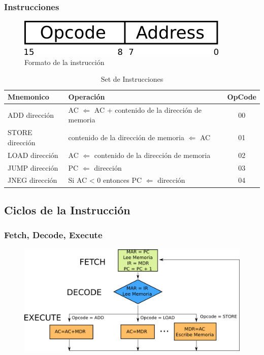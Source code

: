 \documentclass{beamer}
\begin{document}
\begin{frame}
\frametitle{Instrucciones}  
\begin{figure}[h]
  \centering
    \includegraphics[width=.3\textwidth]{graficos/instruccion.png}
  \caption{Formato de la instrucción}
  \label{instruction}
\end{figure} 

\begin{table}[!hbt] 
\centering
\scriptsize{
\begin{tabular}{|l|l|c|}
\hline
 \textbf{Mnemonico} & \textbf{Operación} & \textbf{OpCode}\\ \hline
ADD dirección & AC $\Leftarrow$ AC + contenido de la dirección de memoria & 00\\ \hline
STORE dirección& contenido de la dirección de memoria $\Leftarrow$ AC & 01\\ \hline
LOAD dirección& AC $\Leftarrow$ contenido de la dirección de memoria & 02\\ \hline
JUMP dirección& PC $\Leftarrow$ dirección & 03 \\ \hline
JNEG dirección& Si AC < 0 entonces PC $\Leftarrow$ dirección & 04 \\ \hline
\end{tabular}
}
  \caption{Set de Instrucciones}
\end{table}  
\end{frame}

\subsection{Ciclos de la Instrucción}
\begin{frame}
\frametitle{Fetch, Decode, Execute}   
\begin{figure}[h]
  \centering
    \includegraphics[width=1\textwidth]{graficos/fde.png}
  \label{instruction}
\end{figure} 
\end{frame}
\end{document}
